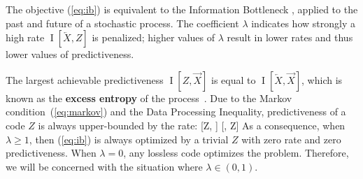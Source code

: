 \documentclass[entropy,article,submit,moreauthors,pdftex,10pt,a4paper]{Definitions/mdpi}
\newcommand{\future}{\overrightarrow{X}}
\newcommand{\past}{\overleftarrow{X}}
\newcommand{\key}{\textbf}
\let\oldequation\equation
\let\oldendequation\endequation
\renewenvironment{equation}
  {\linenomathNonumbers\oldequation}
  {\oldendequation\endlinenomath}
\begin{document}
The objective (\ref{eq:ib}) is equivalent to the Information Bottleneck \citep{tishby-information-1999}, applied to the past and future of a stochastic process.
The coefficient $\lambda$ indicates how strongly a high rate $\operatorname{I}[\past, Z]$ is penalized; higher values of $\lambda$ result in lower rates and thus lower values of predictiveness.

The largest achievable predictiveness $\operatorname{I}[Z, \future]$ is equal to $\operatorname{I}[\past, \future]$, which is known as the \key{excess entropy} of the process~\citep{feldman-synchronizing-2004}.
Due to the Markov condition~(\ref{eq:markov}) and the Data Processing Inequality, predictiveness of a code $Z$ is always upper-bounded by the rate:
\begin{equation}
[Z, \future] \leq {}[\past, Z] 
\end{equation}
As a consequence, when $\lambda \geq 1$, then (\ref{eq:ib}) is always optimized by a trivial $Z$ with zero rate and zero predictiveness.
When $\lambda = 0$, any lossless code optimizes the problem.
Therefore, we will be concerned with the situation where $\lambda \in (0,1)$.

%
%
%
%
%
%
\end{document}
